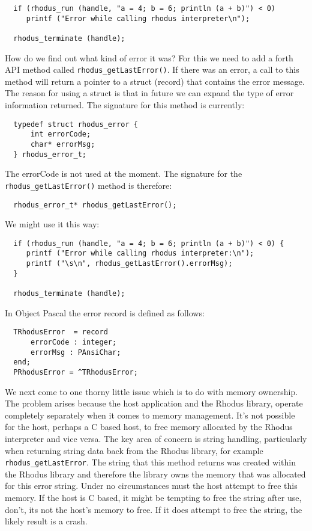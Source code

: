 \begin{lstlisting}
  if (rhodus_run (handle, "a = 4; b = 6; println (a + b)") < 0)
     printf ("Error while calling rhodus interpreter\n");

  rhodus_terminate (handle);
\end{lstlisting}

How do we find out what kind of error it was? For this we need to add a forth API method called {\tt rhodus_getLastError()}. If there was an error, a call to this method will return a pointer to a struct (record) that contains the error message. The reason for using a struct is that in future we can expand the type of error information returned. The signature for this method is currently:

\begin{lstlisting}
  typedef struct rhodus_error {
      int errorCode;
      char* errorMsg;
  } rhodus_error_t;
\end{lstlisting}

The errorCode is not used at the moment. The signature for the {\tt rhodus_getLastError()} method is therefore:


\begin{lstlisting}
  rhodus_error_t* rhodus_getLastError();
\end{lstlisting}

We might use it this way:

\begin{lstlisting}
  if (rhodus_run (handle, "a = 4; b = 6; println (a + b)") < 0) {
     printf ("Error while calling rhodus interpreter:\n");
     printf ("\s\n", rhodus_getLastError().errorMsg);
  }

  rhodus_terminate (handle);
\end{lstlisting}

In Object Pascal the error record is defined as follows:

\begin{lstlisting}
  TRhodusError  = record
      errorCode : integer;
      errorMsg : PAnsiChar;
  end;
  PRhodusError = ^TRhodusError;
\end{lstlisting}  
  
We next come to one thorny little issue which is to do with memory ownership. The problem arises because the host application and the Rhodus library, operate completely separately when it comes to memory management. It's not possible for the host, perhaps a C based host, to free memory allocated by the Rhodus interpreter and vice versa. The key area of concern is string handling, particularly when returning string data back from the Rhodus library, for example {\tt rhodus_getLastError}. The string that this method returns was created within the Rhodus library and therefore the library owns the memory that was allocated for this error string. Under no circumstances must the host attempt to free this memory. If the host is C based, it might be tempting to free the string after use, don't, its not the host's memory to free. If it does attempt to free the string, the likely result is a crash.

